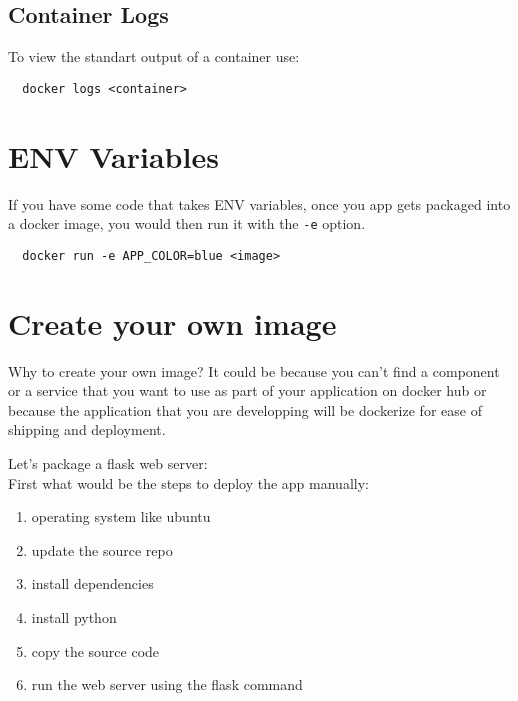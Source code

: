 \documentclass[french]{article}
\begin{document}
\subsection{Container Logs}

To view the standart output of a container use:
\begin{verbatim}
  docker logs <container>
\end{verbatim}

\section{ENV Variables}

If you have some code that takes ENV variables, once you app gets packaged into a docker image, you would then run it with the \verb|-e| option.
\begin{verbatim}
  docker run -e APP_COLOR=blue <image>
\end{verbatim}

\section{Create your own image}

Why to create your own image? It could be because you can't find a component or a service that you want to use as part of your application on docker hub or because the application that you are developping will be dockerize for ease of shipping and deployment.

Let's package a flask web server:\\
First what would be the steps to deploy the app manually:
\begin{enumerate}
  \item  operating system like ubuntu
  \item update the source repo
  \item install dependencies
  \item install python
  \item copy the source code
  \item run the web server using the flask command 
\end{enumerate}$ $
\end{document}
